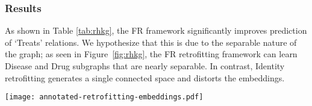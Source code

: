 \documentclass[11pt, a4paper]{article}
\begin{document}
\subsubsection*{Results}
As shown in Table \ref{tab:rhkg}, the FR framework significantly improves prediction of `Treats' relations. We hypothesize that this is due to the separable nature of the graph; as seen in Figure~\ref{fig:rhkg}, the FR retrofitting framework can learn Disease and Drug subgraphs that are nearly separable. In contrast, Identity retrofitting generates a single connected space and distorts the embeddings.



\begin{figure*}[ht]
	\centering
	\texttt{[image: annotated-retrofitting-embeddings.pdf]}
	\caption{t-SNE Projections of the retrofitted embeddings of the drugs (blue) and diseases (orange) in the Roam Health Knowledge Graph, with selected annotations reflecting the `Treats' relation. The distributional space strongly separates the two kinds of entity because their representations were learned in different ways. Identity retrofitting blurs this basic semantic distinction in order to make diseases and drugs in `Treats' relations more similar. As Table \ref{tab:rhkg} shows, the FR models achieve this same unification, but they need not distort the basic drug/disease distinction to do it.}
	\label{fig:rhkg}
\end{figure*}
\end{document}

